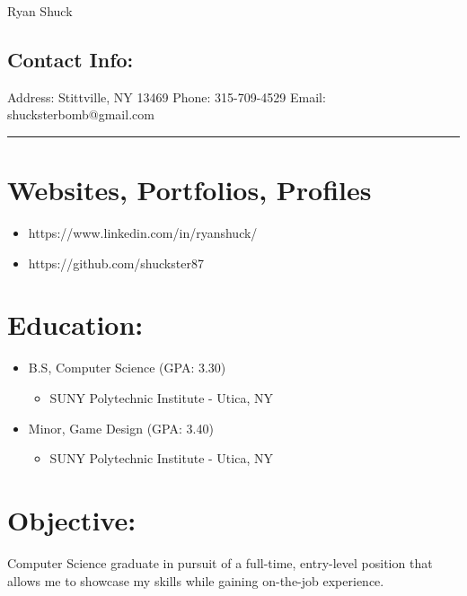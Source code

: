\documentclass[12pt, oneside, a4paper]{article}
\begin{document}
    \begin{flushleft}
        \Huge\color{blue} Ryan Shuck   
    \end{flushleft}

    \begin{flushleft}
    \section*{Contact Info:}
    \footnotesize
    Address: Stittville, NY 13469
    \newline
    Phone: 315-709-4529
    \newline
    Email: shucksterbomb@gmail.com     
    \end{flushleft}

    \noindent
    {\color{blue} \rule{\linewidth}{1mm}}

    \section*{Websites, Portfolios, Profiles}
    \begin{itemize}
    \scriptsize
        \item https://www.linkedin.com/in/ryanshuck/
        \item https://github.com/shuckster87
    \end{itemize}

    \section*{Education:}
    \begin{itemize}
    \scriptsize
    \item B.S, Computer Science  (GPA: 3.30)
        \begin{itemize}
            \item SUNY Polytechnic Institute - Utica, NY
        \end{itemize}
    \item Minor, Game Design (GPA: 3.40)
        \begin{itemize}
            \item SUNY Polytechnic Institute - Utica, NY
        \end{itemize}

    \end{itemize}

    \section*{Objective:}
    \begin{flushleft}
        \footnotesize
        Computer Science graduate in pursuit of a full-time, entry-level position that allows me to showcase my skills while gaining on-the-job experience. 
    \end{flushleft}
   
\end{document}
